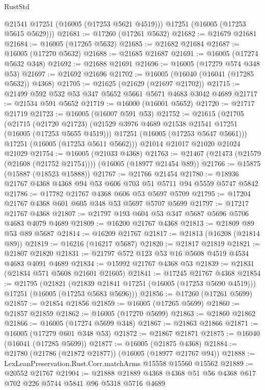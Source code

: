 \begin{lexlean}{RustStd}
\begin{coremodule}
        @21541
        @17251
        (@16005 (@17253 @5621 @4519)))
      @17251
      (@16005 (@17253 @5615 @5629)))
@21681 := @17260 (@17261 @5632)
@21682 := @21679 @21681
@21684 := @16005 (@17265 @5632)
@21685 := @21682 @21684
@21687 := @16005 (@17270 @5632)
@21688 := @21685 @21687
@21691 := @16005 (@17274 @5632 @348)
@21692 := @21688 @21691
@21696 := @16005 (@17279 @574 @348 @53)
@21697 := @21692 @21696
@21702 := @16005 (@16040 (@16041 (@17285 @5632)) @4368)
@21705 := @21625 (@21629 (@21697 @21702))
@21715 := @21499 @592 @532 @53 @347 @5652 @5661 @5671 @4683 @3042 @4689
@21717 := @21534 @591 @5652
@21719 := @16000 (@16001 @5652)
@21720 := @21717 @21719
@21723 := @16005 (@16007 @591 @53)
@21752 := @21615
    (@21705
      (@21715
        (@21720 @21723)
        (@21529 @3976 @4689 @21538 @21541 @17251 (@16005 (@17253 @5655 @4519)))
        @17251
        (@16005 (@17253 @5647 @5661)))
      @17251
      (@16005 (@17253 @5611 @5662)))
    @21014
    @21017
    @21020
    @21024
    @21029
@21754 := @16005 (@21033 @4368)
@21763 := @21467 (@21473 (@21579 (@21608 (@21752 @21754)))) (@16005 (@18977 @21454 @89))
@21766 := @15875 (@15887 (@18523 @15888))
@21767 := @21766 @21454
@21780 := @18936 @21767 @4368 @4368 @94 @53 @606 @703 @51 @5711 @94 @5559 @5747 @5842
@21786 := @17782 @21767 @4368 @606 @53 @5697 @5709
@21795 := @17204 @21767 @4368 @601 @605 @348 @53 @5697 @5707 @5699
@21797 := @17217 @21767 @4368
@21807 := @21797 @193 @604 @53 @347 @5687 @5696 @5706 @4683 @4079 @4689
@21809 := @16200 @21767 @4368
@21813 := @21809 @89 @53 @89 @5687
@21814 := @16209 @21767
@21817 := @21813 (@16208 (@21814 @89))
@21819 := @16216 (@16217 @5687)
@21820 := @21817 @21819
@21821 := @21807 @21820
@21831 := @21797 @572 @123 @53 @16 @5608 @4519 @4534 @4683 @4091 @4689
@21834 := @15992 @21767 @4368 @53
@21839 := @21831 (@21834 @571 @5608 @21601 @21605)
@21841 := @17245 @21767 @4368
@21854 := @21795
    (@21821
      (@21839 @21841 @17251 (@16005 (@17253 @5690 @4519)))
      @17251
      (@16005 (@17253 @5683 @5696)))
@21856 := @17260 (@17261 @5699)
@21857 := @21854 @21856
@21859 := @16005 (@17265 @5699)
@21860 := @21857 @21859
@21862 := @16005 (@17270 @5699)
@21863 := @21860 @21862
@21866 := @16005 (@17274 @5699 @348)
@21867 := @21863 @21866
@21871 := @16005 (@17279 @601 @348 @53)
@21872 := @21867 @21871
@21875 := @16040 (@16041 (@17285 @5699))
@21877 := @16005 (@21875 @4368)
@21884 := @21780 (@21786 (@21872 @21877)) (@16005 (@18977 @21767 @94))
@21888 := LexLeanPreservation.Rust.Corr.matchArms @15558 @15560 @15562
@21889 := @20552 @21767
@21904 := @21888 @21889 @4368 @4368 @51 @56 @4368 @617 @702 @226 @5744 @5841 @96 @5318 @5716 @4689

\end{coremodule}
\end{lexlean}
